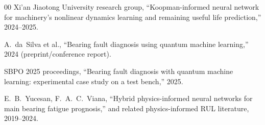 \documentclass[3p,times,procedia]{elsarticle}
\begin{document}
\begin{thebibliography}{00}
Xi'an Jiaotong University research group, ``Koopman-informed neural network for machinery's nonlinear dynamics learning and remaining useful life prediction,'' 2024--2025.

A.~da~Silva et al., ``Bearing fault diagnosis using quantum machine learning,'' 2024 (preprint/conference report).

SBPO 2025 proceedings, ``Bearing fault diagnosis with quantum machine learning: experimental case study on a test bench,'' 2025.

E.~B.~Yucesan, F.~A.~C.~Viana, ``Hybrid physics-informed neural networks for main bearing fatigue prognosis,'' and related physics-informed RUL literature, 2019--2024.

\end{thebibliography}
\end{document}
